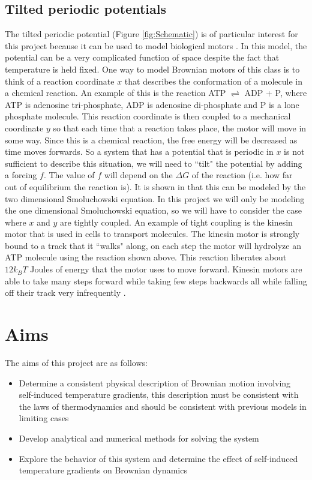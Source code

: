 \subsection{Tilted periodic potentials}
The tilted periodic potential (Figure \ref{fig:Schematic}) is of particular interest for this project because it can be used to model biological motors \cite{Leibler1993,Magnasco1994}. In this model, the potential can be a very complicated function of space despite the fact that temperature is held fixed. One way to model Brownian motors of this class is to think of a reaction coordinate $x$ that describes the conformation of a molecule in a chemical reaction. An example of this is the reaction ATP $\rightleftharpoons$ ADP + P, where ATP is adenosine tri-phosphate, ADP is adenosine di-phosphate and P is a lone phosphate molecule. This reaction coordinate is then coupled to a mechanical coordinate $y$ so that each time that a reaction takes place, the motor will move in some way. Since this is a chemical reaction, the free energy will be decreased as time moves forwards. So a system that has a potential that is periodic in $x$ is not sufficient to describe this situation, we will need to ``tilt" the potential by adding a forcing $f$. The value of $f$ will depend on the $\Delta G$ of the reaction (i.e. how far out of equilibrium the reaction is). It is shown in \cite{Magnasco1994} that this can be modeled by the two dimensional Smoluchowski equation. In this project we will only be modeling the one dimensional Smoluchowski equation, so we will have to consider the case where $x$ and $y$ are tightly coupled. An example of tight coupling is the kinesin motor \cite{Leibler1993} that is used in cells to transport molecules. The kinesin motor is strongly bound to a track that it ``walks" along, on each step the motor will hydrolyze an ATP molecule using the reaction shown above. This reaction liberates about $12 k_B T$ Joules of energy that the motor uses to move forward. Kinesin motors are able to take many steps forward while taking few steps backwards all while falling off their track very infrequently \cite{BlockSM1990}.
\section{Aims}
The aims of this project are as follows:
\begin{itemize}
\item{Determine a consistent physical description of Brownian motion involving self-induced temperature gradients, this description must be consistent with the laws of thermodynamics and should be consistent with previous models in limiting cases}
\item{Develop analytical and numerical methods for solving the system}
\item{Explore the behavior of this system and determine the effect of self-induced temperature gradients on Brownian dynamics}
\end{itemize}

